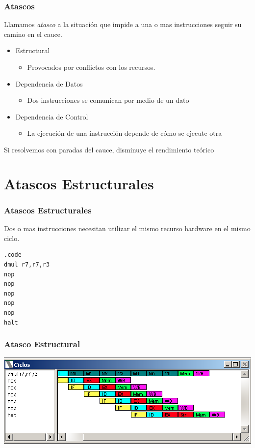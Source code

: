 \documentclass{beamer}
\begin{document}
\begin{frame}
\frametitle{Atascos}
Llamamos \emph{atasco} a la situación que impide a una o mas instrucciones seguir su camino en el cauce.

\begin{itemize}
\item Estructural
\begin{itemize}
\item Provocados por conflictos con los recursos.
\end{itemize}


\item Dependencia de Datos
\begin{itemize}
\item Dos instrucciones se comunican por medio de un dato
\end{itemize}

\item Dependencia de Control
\begin{itemize}
\item La ejecución de una instrucción depende de cómo se ejecute otra
\end{itemize}

\end{itemize}
Si resolvemos con paradas del cauce, disminuye el rendimiento teórico
\end{frame}


\section{Atascos Estructurales}

\begin{frame}[fragile]
\frametitle{Atascos Estructurales}
Dos o mas instrucciones necesitan utilizar el mismo recurso hardware en el mismo ciclo.

\begin{block}{}
\begin{lstlisting}[basicstyle=\ttfamily,keywordstyle=\color{blue}]
.code
dmul r7,r7,r3
nop 
nop 
nop 
nop 
nop 
halt
\end{lstlisting}
\end{block}
\end{frame}

\begin{frame}[fragile]
\frametitle{Atasco Estructural}
\includegraphics[scale=0.45]{atasco-estructural.png}
\end{frame}
\end{document}
